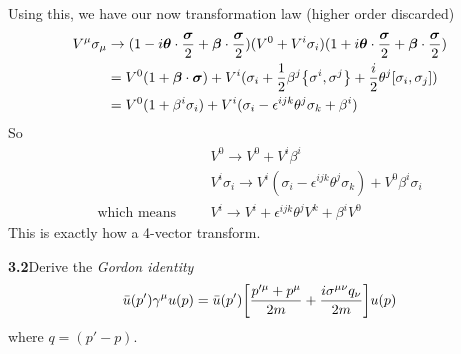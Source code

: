 \documentclass{article}
\newcommand{\bm}[1]{\boldsymbol{#1}}
\begin{document}
Using this, we have our now transformation law (higher order discarded)
\begin{align*}
  V^{\mu}\sigma_{\mu}&\rightarrow(1-i\bm{\theta}\cdot \frac{\bm{\sigma}}{2}+\bm{\beta}\cdot \frac{\bm{\sigma}}{2})(V^0+V^i\sigma_i)(1+i\bm{\theta}\cdot \frac{\bm{\sigma}}{2}+\bm{\beta}\cdot\frac{\bm{\sigma}}{2})\\
  &=V^0(1+\bm{\beta}\cdot\bm{\sigma})+V^i(\sigma_i+\frac{1}{2}\beta^j\qty{\sigma^i,\sigma^j}+\frac{i}{2}\theta^j[\sigma_i,\sigma_j])\\
  &=V^0(1+\beta^i\sigma_i)+V^i(\sigma_i-\epsilon^{ijk}\theta^j\sigma_k+\beta^i)
\end{align*}
So
\begin{align*}
  &V^0\rightarrow V^0+V^i\beta^i\\
  &V^i\sigma_i\rightarrow V^i(\sigma_i-\epsilon^{ijk}\theta^j\sigma_k)+V^0\beta^i\sigma_i\\
  \text{which means}\;\;\;\;\;\;&V^i\rightarrow V^i+\epsilon^{ijk}\theta^jV^k+\beta^iV^0
\end{align*}
This is exactly how a 4-vector transform.

{\bf{3.2}}\quad Derive the \emph{Gordon identity}
\begin{align}\label{40}
  \bar{u}(p')\gamma^{\mu}u(p)=\bar{u}(p')\bqty{\frac{p'^{\mu}+p^{\mu}}{2m}+\frac{i\sigma^{\mu\nu}q_{\nu}}{2m}}u(p)
\end{align}
where $q=(p'-p)$.
\end{document}
